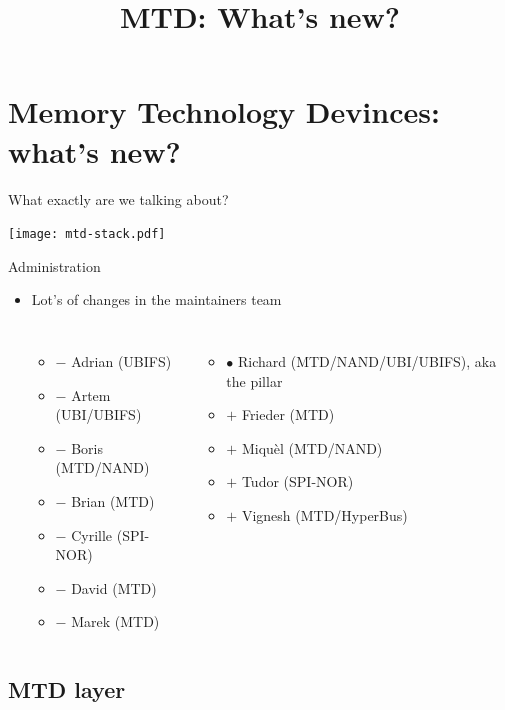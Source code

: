 \documentclass[aspectratio=169,obeyspaces,spaces,hyphens,dvipsnames]{beamer}
\title{MTD: What's new?}
\institute{Bootlin \hfill Sigma-star GmbH}
\begin{document}
\section{Memory Technology Devinces: what's new?}

\newcommand\added{\item[$+$]}
\newcommand\removed{\item[$-$]}
\newcommand\surviving{\item[$\bullet$]}

\begin{frame}{What exactly are we talking about?}
  \begin{center}
    \texttt{[image: mtd-stack.pdf]}
  \end{center}
\end{frame}

\begin{frame}{Administration}
  \begin{itemize}
  \item Lot's of changes in the maintainers team
    \begin{columns}
      \begin{itemize}
        \removed Adrian (UBIFS)
        \removed Artem (UBI/UBIFS)
        \removed Boris (MTD/NAND)
        \removed Brian (MTD)
        \removed Cyrille (SPI-NOR)
        \removed David (MTD)
        \removed Marek (MTD)
      \end{itemize}
      \begin{itemize}
        \surviving Richard (MTD/NAND/UBI/UBIFS), aka the pillar
        \added Frieder (MTD)
        \added Miquèl (MTD/NAND)
        \added Tudor (SPI-NOR)
        \added Vignesh (MTD/HyperBus)
      \end{itemize}
    \end{columns}
  \end{itemize}
\end{frame}

\subsection{MTD layer}
\end{document}
